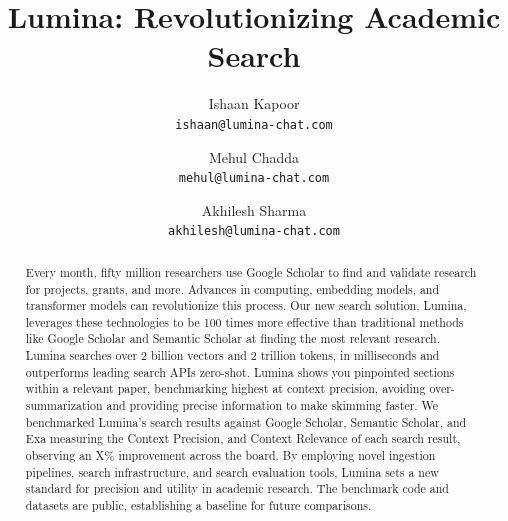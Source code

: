 \documentclass{article}
\title{Lumina: Revolutionizing Academic Search}
\author{
    Ishaan Kapoor \\
    \texttt{ishaan@lumina-chat.com} \\
    \and
    Mehul Chadda \\
    \texttt{mehul@lumina-chat.com} \\
    \and
    Akhilesh Sharma \\
    \texttt{akhilesh@lumina-chat.com}
}
\date{}
\begin{document}
\maketitle
\begin{abstract}
    Every month, fifty million researchers use Google Scholar to find and validate research for projects, grants, and more. Advances in computing, embedding models, and transformer models can revolutionize this process. Our new search solution, Lumina, leverages these technologies to be 100 times more effective than traditional methods like Google Scholar and Semantic Scholar at finding the most relevant research. Lumina searches over 2 billion vectors and 2 trillion tokens, in milliseconds and outperforms leading search APIs zero-shot.
    Lumina shows you pinpointed sections within a relevant paper, benchmarking highest at context precision, avoiding over-summarization and providing precise information to make skimming faster. We benchmarked Lumina's search results against Google Scholar, Semantic Scholar, and Exa measuring the Context Precision, and Context Relevance of each search result, observing an X\% improvement across the board. By employing novel ingestion pipelines, search infrastructure, and search evaluation tools, Lumina sets a new standard for precision and utility in academic research. The benchmark code and datasets are public, establishing a baseline for future comparisons.
\end{abstract}

\newpage
\end{document}

